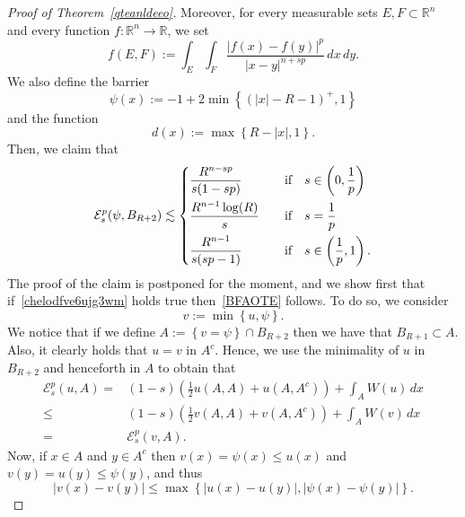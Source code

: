 \documentclass[12pt]{article}
\newcommand{\R}{\mathbb{R}}
\numberwithin{equation}{section}
\renewcommand{\leq}{\leqslant}
\begin{document}
\begin{proof}[Proof of Theorem~\ref{qteanldeeo}]
Moreover, for every measurable sets $E,F\subset \R^n$  and every
function $f:\R^n\to \R$, we set
\begin{equation*}
f(E,F):=\int_{E}\int_{F}\frac{\left|f(x)-f(y)\right|^p}{\left|x-y\right|^{n+sp}}\,dx\,dy.
\end{equation*}
We also define the barrier 
\begin{equation}\label{bar}
\psi(x):=-1+2\min \left\lbrace \left(\left|x\right|-R-1\right)^{+},1 \right\rbrace
\end{equation}
and the function
\begin{equation}\label{CliopCliop}
d(x):=\max\left\lbrace  R-\left|x\right|,1 \right\rbrace.
\end{equation}
Then, we claim that  
\begin{equation}\label{chelodfve6ujg3wm}
\mathcal{E}_s^p(\psi,B_{R+2})\lesssim  \begin{dcases}
\frac{R^{n-sp}}{s(1-sp)}\quad &\mbox{if}\quad s\in \left(0,\frac{1}{p}\right)\\
\frac{R^{n-1}\log(R)}{s}\quad &\mbox{if}\quad s=\frac{1}{p}\\
\frac{R^{n-1}}{s(sp-1)}\quad &\mbox{if}\quad s\in \left(\frac{1}{p},1\right).
\end{dcases}
\end{equation}
The proof of the claim is postponed for the moment, and we show first that if~\eqref{chelodfve6ujg3wm} holds true then~\eqref{BFAOTE} follows. To do so, we consider 
\begin{equation*}
v:=\min \left\lbrace u,\psi \right\rbrace. 
\end{equation*}
We notice that if we define 
$A:=\left\lbrace v=\psi \right\rbrace\cap B_{R+2}$ then we have that $B_{R+1}\subset A$. Also, it clearly holds that $u=v$ in $A^c$. Hence, we use the minimality of $u$ in $B_{R+2}$ and henceforth in $A$ to obtain that
\begin{equation}\label{JSTFC}
\begin{split}
\mathcal{E}_s^p(u,A)= & (1-s)\left(\frac{1}{2}u(A,A)+u(A,A^c)\right)+\int_{A}W(u)\,dx\\ 
\leq & (1-s)\left(\frac{1}{2}v(A,A)+v(A,A^c)\right)+\int_{A}W(v)\,dx\\
= &\mathcal{E}_s^p(v,A). 
\end{split}
\end{equation} 
Now, if $x\in A$ and $y\in A^c$ then $v(x)=\psi(x)\leq u(x)$ and $v(y)=u(y)\leq \psi(y)$, and thus 
\begin{equation*}
\left|v(x)-v(y)\right|\leq \max\left\lbrace \left|u(x)-u(y)\right|,\left|\psi(x)-\psi(y)\right| \right\rbrace.

\end{equation*}
\end{proof}
\end{document}
